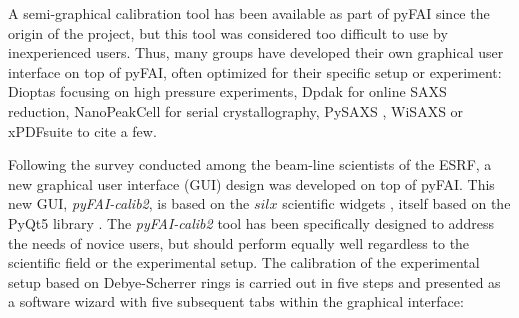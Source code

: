 \documentclass[preprint]{iucr}              %
\begin{document}
A semi-graphical calibration tool has been available as part of pyFAI
\cite{fv5028} since the origin of the project, but this tool was considered too
difficult to use by inexperienced users.
Thus, many groups have developed their own graphical user interface on top of
pyFAI, often optimized for their specific setup or experiment:
Dioptas \cite{diopta_publi} focusing on high pressure experiments, 
Dpdak \cite{dpdak} for online SAXS reduction, 
NanoPeakCell \cite{nanopeakcell} for serial crystallography,
PySAXS \cite{pysaxs}, WiSAXS or xPDFsuite \cite{xpdfsuite} to cite a few.

Following the survey conducted among the beam-line scientists of the ESRF, a
new graphical user interface (GUI) design was developed on top of pyFAI.
This new GUI, \textit{pyFAI-calib2}, is based on the $silx$ scientific widgets \cite{silx_v0.5.0}, 
itself based on the PyQt5 library \cite{pyqt}.  
The \textit{pyFAI-calib2} tool has been specifically designed to address the needs 
of novice users, but should perform equally well regardless to the scientific field 
or the experimental setup.
The calibration of the experimental setup based on Debye-Scherrer rings 
is carried out in five steps and presented as a software wizard with five
subsequent tabs within the graphical interface:
\end{document}
